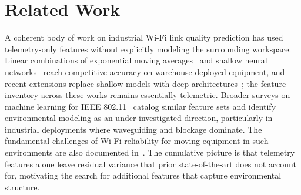 \documentclass[conference]{IEEEtran}
\begin{document}
\section{Related Work}
\label{sec:rw}

A coherent body of work on industrial Wi\nobreakdash-Fi link quality prediction has used telemetry-only features without explicitly modeling the surrounding workspace. Linear combinations of exponential moving averages~\cite{formis2023moving} and shallow neural networks~\cite{colletto2023ann,scanzio2022ann} reach competitive accuracy on warehouse-deployed equipment, and recent extensions replace shallow models with deep architectures~\cite{formis2024deep,formis2025wifi}; the feature inventory across these works remains essentially telemetric. Broader surveys on machine learning for IEEE 802.11~\cite{wilhelmi2024aiml,szott2022wifimeetsml} catalog similar feature sets and identify environmental modeling as an under-investigated direction, particularly in industrial deployments where waveguiding and blockage dominate. The fundamental challenges of Wi\nobreakdash-Fi reliability for moving equipment in such environments are also documented in~\cite{cena2025wifi}. The cumulative picture is that telemetry features alone leave residual variance that prior state-of-the-art does not account for, motivating the search for additional features that capture environmental structure.
\end{document}
